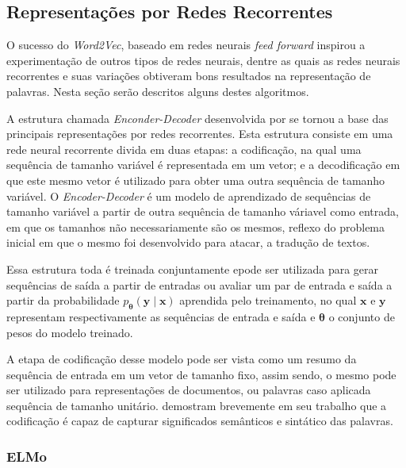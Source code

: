 
\subsection{Representações por Redes Recorrentes}

O sucesso do \textit{Word2Vec}, baseado em redes neurais \textit{feed forward}
inspirou a experimentação de outros tipos de redes neurais, dentre as quais as
redes neurais recorrentes e suas variações obtiveram bons resultados na
representação de palavras.
Nesta seção serão descritos alguns destes algoritmos.

A estrutura chamada \textit{Enconder-Decoder} desenvolvida por \citet{cho14} se
tornou a base das principais representações por redes recorrentes.
Esta estrutura consiste em uma rede neural recorrente divida em duas etapas: a
codificação, na qual uma sequência de tamanho variável é representada em um
vetor; e a decodificação em que este mesmo vetor é utilizado para obter uma
outra sequência de tamanho variável.
O \textit{Encoder-Decoder} é um modelo de aprendizado de sequências de tamanho
variável a partir de outra sequência de tamanho váriavel como entrada, em que
os tamanhos não necessariamente são os mesmos, reflexo do problema inicial em
que o mesmo foi desenvolvido para atacar, a tradução de textos.


Essa estrutura toda é treinada conjuntamente epode ser utilizada para gerar
sequências de saída a partir de entradas ou avaliar um par de entrada e saída a
partir da probabilidade $p_{\mathbf{\theta}}(\mathbf{y} \mid \mathbf{x})$
aprendida pelo treinamento, no qual $\mathbf{x}$ e $\mathbf{y}$ representam
respectivamente as sequências de entrada e saída e $\mathbf{\theta}$ o conjunto
de pesos do modelo treinado.

A etapa de codificação desse modelo pode ser vista como um resumo da sequência
de entrada em um vetor de tamanho fixo, assim sendo, o mesmo pode ser utilizado
para representações de documentos, ou palavras caso aplicada sequência de
tamanho unitário.
\citet{cho14} demostram brevemente em seu trabalho que a codificação é capaz de
capturar significados semânticos e sintático das palavras.

\subsubsection{ELMo}

